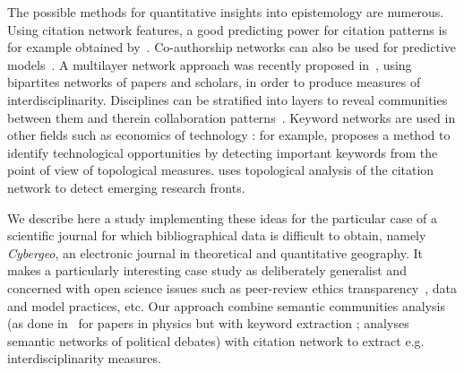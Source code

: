 


The possible methods for quantitative insights into epistemology are numerous. %
 Using citation network features, a good predicting power for citation patterns is for example obtained by~\cite{2013arXiv1310.8220N}. Co-authorship networks can also be used for predictive models~\cite{2014arXiv1402.7268S}. A multilayer network approach was recently proposed in~\cite{2016arXiv160106075O}, using bipartites networks of papers and scholars, in order to produce measures of interdisciplinarity. Disciplines can be stratified into layers to reveal communities between them and therein collaboration patterns~\cite{2015arXiv150601280B}. Keyword networks are used in other fields such as economics of technology : for example, \cite{choi2014patent} proposes a method to identify technological opportunities by detecting important keywords from the point of view of topological measures. \cite{shibata2008detecting} uses topological analysis of the citation network to detect emerging research fronts.

We describe here a study implementing these ideas for the particular case of a scientific journal for which bibliographical data is difficult to obtain, namely \textit{Cybergeo}, an electronic journal in theoretical and quantitative geography. It makes a particularly interesting case study as deliberately generalist and concerned with open science issues such as peer-review ethics transparency~\cite{10.1371/journal.pone.0147913}, data and model practices, etc. Our approach combine semantic communities analysis (as done in~\cite{2016arXiv160208451P} for papers in physics but with keyword extraction ; \cite{2015arXiv151003797G} analyses semantic networks of political debates) with citation network to extract e.g. interdisciplinarity measures.









